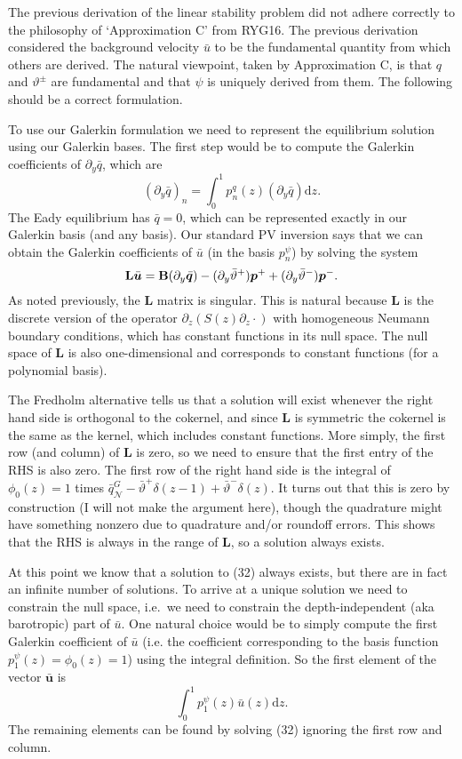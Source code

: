\documentclass[10pt]{article}
\newcommand{\pd}[1]{\partial_{#1}}
\newcommand{\sN}{\mathcal{N}}
\newcommand{\mat}[1]{\text{\bf #1}}
\begin{document}
The previous derivation of the linear stability problem did not adhere correctly to the philosophy of `Approximation C' from RYG16.
The previous derivation considered the background velocity $\bar u$ to be the fundamental quantity from which others are derived.
The natural viewpoint, taken by Approximation C, is that $q$ and $\vartheta^\pm$ are fundamental and that $\psi$ is uniquely derived from them.
The following should be a correct formulation.

To use our Galerkin formulation we need to represent the equilibrium solution using our Galerkin bases.
The first step would be to compute the Galerkin coefficients of $\pd{y}\bar q$, which are 
\begin{equation}
(\pd{y}\bar q)_n = \int_0^1 p_n^q(z)(\pd{y}\bar q)\text{d}z.
\end{equation}
The Eady equilibrium has $\bar q=0$, which can be represented exactly in our Galerkin basis (and any basis).
Our standard PV inversion says that we can obtain the Galerkin coefficients of $\bar u$ (in the basis $p_n^\psi$) by solving the system
\begin{equation}
\mat{L}\bar{\bm{u}} =\mat{B}(\pd{y}\bar{\bm{q}}) -(\pd{y}\bar{\vartheta}^+)\bm{p}^++(\pd{y}\bar{\vartheta}^-)\bm{p}^-.
\end{equation}
As noted previously, the {\bf L} matrix is singular.
This is natural because {\bf L} is the discrete version of the operator $\pd{z}(S(z)\pd{z}\cdot)$ with homogeneous Neumann boundary conditions, which has constant functions in its null space.
The null space of {\bf L} is also one-dimensional and corresponds to constant functions (for a polynomial basis).

The Fredholm alternative tells us that a solution will exist whenever the right hand side is orthogonal to the cokernel, and since {\bf L} is symmetric the cokernel is the same as the kernel, which includes constant functions.
More simply, the first row (and column) of {\bf L} is zero, so we need to ensure that the first entry of the RHS is also zero.
The first row of the right hand side is the integral of $\phi_0(z) = 1$ times $\bar q_\sN^G - \bar\vartheta^+\delta(z-1)+\bar\vartheta^-\delta(z)$.
It turns out that this is zero by construction (I will not make the argument here), though the quadrature might have something nonzero due to quadrature and/or roundoff errors.
This shows that the RHS is always in the range of {\bf L}, so a solution always exists.

At this point we know that a solution to (32) always exists, but there are in fact an infinite number of solutions.
To arrive at a unique solution we need to constrain the null space, i.e.~we need to constrain the depth-independent (aka barotropic) part of $\bar u$.
One natural choice would be to simply compute the first Galerkin coefficient of $\bar u$ (i.e. the coefficient corresponding to the basis function $p_1^\psi(z) = \phi_0(z) = 1$) using the integral definition.
So the first element of the vector $\bar{\bm{u}}$ is 
\[\int_0^1p_1^\psi(z)\bar{u}(z)\text{d}z.\]
The remaining elements can be found by solving (32) ignoring the first row and column.
\end{document}
